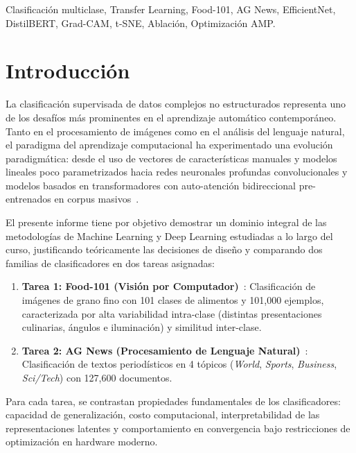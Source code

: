 \documentclass[conference]{IEEEtran}
\begin{document}
\begin{IEEEkeywords}
Clasificación multiclase, Transfer Learning, Food-101, AG News, EfficientNet, DistilBERT, Grad-CAM, t-SNE, Ablación, Optimización AMP.
\end{IEEEkeywords}

\section{Introducción}
La clasificación supervisada de datos complejos no estructurados representa uno de los desafíos más prominentes en el aprendizaje automático contemporáneo. Tanto en el procesamiento de imágenes como en el análisis del lenguaje natural, el paradigma del aprendizaje computacional ha experimentado una evolución paradigmática: desde el uso de vectores de características manuales y modelos lineales poco parametrizados hacia redes neuronales profundas convolucionales y modelos basados en transformadores con auto-atención bidireccional pre-entrenados en corpus masivos~\cite{he2016deep,vaswani2017attention}.

El presente informe tiene por objetivo demostrar un dominio integral de las metodologías de Machine Learning y Deep Learning estudiadas a lo largo del curso, justificando teóricamente las decisiones de diseño y comparando dos familias de clasificadores en dos tareas asignadas:
\begin{enumerate}
    \item \textbf{Tarea 1: Food-101 (Visión por Computador)}~\cite{bossard2014food}: Clasificación de imágenes de grano fino con 101 clases de alimentos y 101,000 ejemplos, caracterizada por alta variabilidad intra-clase (distintas presentaciones culinarias, ángulos e iluminación) y similitud inter-clase.
    \item \textbf{Tarea 2: AG News (Procesamiento de Lenguaje Natural)}~\cite{zhang2015character}: Clasificación de textos periodísticos en 4 tópicos (\textit{World}, \textit{Sports}, \textit{Business}, \textit{Sci/Tech}) con 127,600 documentos.
\end{enumerate}

Para cada tarea, se contrastan propiedades fundamentales de los clasificadores: capacidad de generalización, costo computacional, interpretabilidad de las representaciones latentes y comportamiento en convergencia bajo restricciones de optimización en hardware moderno.
\end{document}
